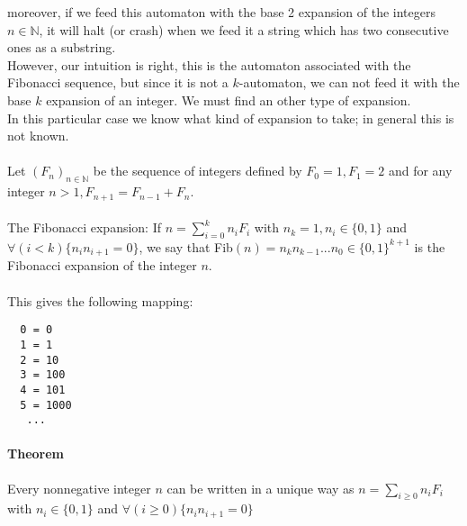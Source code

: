 \documentclass{article}
\begin{document}
moreover, if we feed this automaton with the base 2 expansion of the integers
$n \in \mathbb{N}$, it will halt (or crash) when we feed it a string which has
two consecutive ones as a substring.\\
However, our intuition is right, this is the automaton associated with the
Fibonacci sequence, but since it is not a $k$-automaton, we can not feed it
with the base $k$ expansion of an integer. We must find an other type of
expansion.\\
In this particular case we know what kind of expansion to take; in general this
is not known.\\
\\
Let $(F_n)_{n \in \mathbb{N}}$ be the sequence of integers defined by $F_0 = 1,
F_1 = 2$ and for any integer $n > 1, F_{n + 1} = F_{n - 1} + F_n$.\\
\\
The Fibonacci expansion: If $n = \sum_{i = 0}^k n_i F_i$ with
$n_k = 1, n_i \in \{0, 1\}$ and $\forall (i < k) \{n_i n_{i + 1} = 0\}$, we
say that Fib$(n) = n_k n_{k - 1} ... n_0 \in \{0, 1\}^{k + 1}$ is the
Fibonacci expansion of the integer $n$.\\
\\
This gives the following mapping:
\begin{verbatim}
  0 = 0
  1 = 1
  2 = 10
  3 = 100
  4 = 101
  5 = 1000
   ...
\end{verbatim}

\paragraph{Theorem}
Every nonnegative integer $n$ can be written in a unique way as
$n = \sum_{i \ge 0} n_i F_i$ with $n_i \in \{0, 1\}$ and
$\forall (i \ge 0) \{n_i n_{i + 1} = 0\}$
\end{document}
